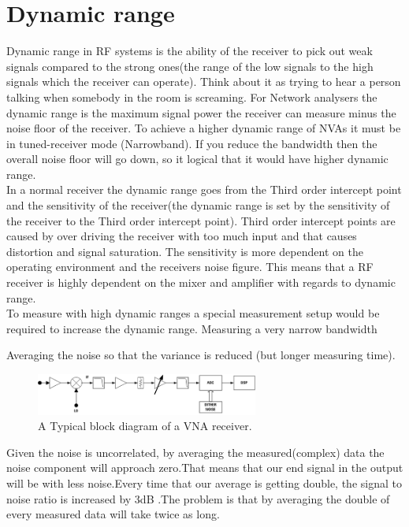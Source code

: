 \section{Dynamic range}
Dynamic range in RF systems is the ability of the receiver to pick out weak signals compared to the strong ones(the range of the low signals to the high signals which the receiver can operate). Think about it as trying to hear a person talking when somebody in the room is screaming. For Network analysers the dynamic range is the maximum signal power the receiver can measure minus the noise floor of the receiver. To achieve a higher dynamic range of NVAs it must be  in tuned-receiver mode (Narrowband). If you reduce the bandwidth then the overall noise floor will go down, so it logical that it would have higher dynamic range. \citep{AgilentNVA} \\
In a normal receiver the dynamic range goes from the Third order intercept point and the sensitivity of the receiver(the dynamic range is set by the sensitivity of the receiver to the Third order intercept point). Third order intercept points are caused by over driving the receiver with too much input and that causes distortion and signal saturation. The sensitivity is more dependent on the operating environment and the receivers noise figure. \citep{understandDynamic} This means that a RF receiver is highly dependent on the mixer and amplifier with regards to dynamic range.\\
To measure with high dynamic ranges a special measurement setup would be required to increase the dynamic range.
Measuring a very narrow bandwidth

Averaging the noise so that the variance is reduced (but longer measuring time).

\begin{figure}[H]
\centering
\includegraphics[width=0.65\textwidth]{figures/Block_VNA.png}
\caption{A Typical block diagram of a VNA receiver.}
\label{fading_gain}
\end{figure}

Given the noise is uncorrelated, by averaging the measured(complex) data the noise component will approach zero.That means that our end signal in the output will be with less noise.Every time that our average is getting double, the signal to noise ratio is increased by 3dB .The problem is that by averaging the double of every measured data will take twice as long.\citep{KeysightAVG}



